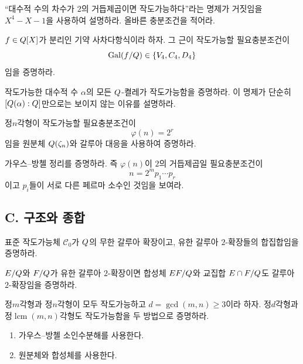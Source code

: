 \begin{exercise}
``대수적 수의 차수가 $2$의 거듭제곱이면 작도가능하다''라는 명제가 거짓임을 $X^4-X-1$을 사용하여 설명하라. 올바른 충분조건을 적어라.
\end{exercise}

\begin{exercise}[*]
$f\in Q[X]$가 분리인 기약 사차다항식이라 하자. 그 근이 작도가능할 필요충분조건이
\[
  \operatorname{Gal}(f/Q)\in\{V_4,C_4,D_4\}
\]
임을 증명하라.
\end{exercise}

\begin{exercise}
작도가능한 대수적 수 $\alpha$의 모든 $Q$-켤레가 작도가능함을 증명하라. 이 명제가 단순히 $[Q(\alpha):Q]$만으로는 보이지 않는 이유를 설명하라.
\end{exercise}

\begin{exercise}[*]
정$n$각형이 작도가능할 필요충분조건이
\[
  \varphi(n)=2^r
\]
임을 원분체 $Q(\zeta_n)$와 갈루아 대응을 사용하여 증명하라.
\end{exercise}

\begin{exercise}
가우스--방첼 정리를 증명하라. 즉 $\varphi(n)$이 $2$의 거듭제곱일 필요충분조건이
\[
  n=2^m p_1\cdots p_r
\]
이고 $p_i$들이 서로 다른 페르마 소수인 것임을 보여라.
\end{exercise}

\subsection*{C. 구조와 종합}

\begin{exercise}[*]
표준 작도가능체 $\mathcal C_0$가 $Q$의 무한 갈루아 확장이고, 유한 갈루아 $2$-확장들의 합집합임을 증명하라.
\end{exercise}

\begin{exercise}
$E/Q$와 $F/Q$가 유한 갈루아 $2$-확장이면 합성체 $EF/Q$와 교집합 $E\cap F/Q$도 갈루아 $2$-확장임을 증명하라.
\end{exercise}

\begin{exercise}[*]
정$m$각형과 정$n$각형이 모두 작도가능하고 $d=\gcd(m,n)\ge3$이라 하자. 정$d$각형과 정$\operatorname{lcm}(m,n)$각형도 작도가능함을 두 방법으로 증명하라.
\begin{enumerate}[label=(\alph*)]
  \item 가우스--방첼 소인수분해를 사용한다.
  \item 원분체와 합성체를 사용한다.
\end{enumerate}
\end{exercise}

